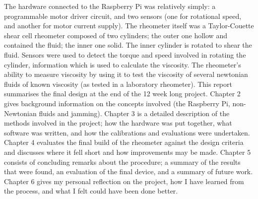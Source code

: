 \documentclass[twoside,a4]{report}
\def\br{\newline \newline \noindent}
\begin{document}
	The hardware connected to the Raspberry Pi was relatively simply: a programmable motor driver circuit, and two sensors (one for rotational speed, and another for motor current supply).\br
	The rheometer itself was a Taylor-Couette shear cell rheometer composed of two cylinders; the outer one hollow and contained the fluid; the inner one solid. The inner cylinder is rotated to shear the fluid. Sensors were used to detect the torque and speed involved in rotating the cylinder, information which is used to calculate the viscosity. The rheometer's ability to measure viscosity by using it to test the viscosity of several newtonian fluids of known viscosity (as tested in a laboratory rheometer).
	\br 
	This report summarises the final design at the end of the 12 week long project. Chapter 2 gives background information on the concepts involved (the Raspberry Pi, non-Newtonian fluids and jamming). Chapter 3 is a detailed description of the methods involved in the project; how the hardware was put together, what software was written, and how the calibrations and evaluations were undertaken. Chapter 4 evaluates the final build of the rheometer against the design criteria and discusses where it fell short and how improvements may be made. Chapter 5 consists of concluding remarks about the procedure; a summary of the results that were found, an evaluation of the final device, and a summary of future work. Chapter 6 gives my personal reflection on the project, how I have learned from the process, and what I felt could have been done better.
	
\end{document}
